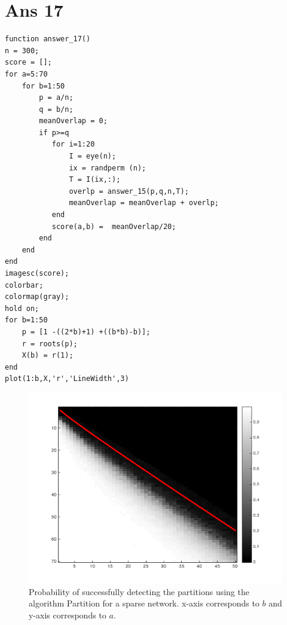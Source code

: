 \documentclass[10pt]{article}
\begin{document}
\section*{Ans 17}
\begin{flushleft}
\begin{lstlisting}
function answer_17()
n = 300;
score = [];
for a=5:70
    for b=1:50
        p = a/n;
        q = b/n;
        meanOverlap = 0;
        if p>=q
           for i=1:20
               I = eye(n);
               ix = randperm (n);
               T = I(ix,:);
               overlp = answer_15(p,q,n,T);
               meanOverlap = meanOverlap + overlp;
           end
           score(a,b) =  meanOverlap/20;
        end
    end
end
imagesc(score);
colorbar;
colormap(gray);
hold on;
for b=1:50
    p = [1 -((2*b)+1) +((b*b)-b)];
    r = roots(p);
    X(b) = r(1);
end
plot(1:b,X,'r','LineWidth',3)
\end{lstlisting}
\begin{figure}[!htb]
\includegraphics{17.png}
\caption{Probability of successfully detecting the partitions using the algorithm Partition for a sparse network. x-axis corresponds to $b$ and y-axis corresponds to $a$.}
\end{figure}
\end{flushleft}
\end{document}
